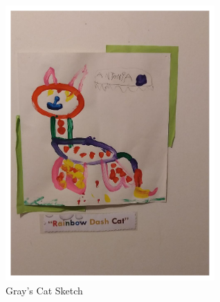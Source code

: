 \begin{figure}
	\includegraphics[width=8cm]{GrayCatPic.pdf}
  \caption{Gray's Cat Sketch}
  \label{Rainbow Dash Cat}
\end{figure}

\clearpage
